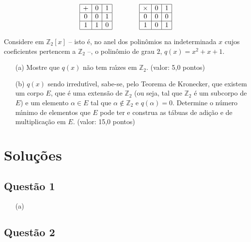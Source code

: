 \documentclass{report}
\begin{document}
$$\begin{array}{|c|c|c|}
\hline + & 0 & 1 \\
\hline 0 & 0 & 1 \\
\hline 1 & 1 & 0 \\
\hline
\end{array} \qquad \qquad
\begin{array}{|c|c|c|}
\hline \times & 0 & 1 \\
\hline 0 & 0 & 0 \\
\hline 1 & 0 & 1 \\
\hline
\end{array}$$

Considere em $\mathbb Z_2[x]$ – isto \'e, no anel dos polinômios na indeterminada $x$ cujos coeficientes pertencem a $\mathbb Z_2$ –, o polinômio de grau $2$, $q (x) = x^2 + x + 1$.

\begin{enumerate}

\item[(a)] Mostre que $q(x)$ n\~ao tem ra\'\i zes em $\mathbb Z_2$. (valor: 5,0 pontos)

\item[(b)] $q(x)$ sendo irredut\'\i vel, sabe-se, pelo Teorema de Kronecker, que existem um corpo $E$, que \'e uma extens\~ao de $\mathbb Z_2$ (ou seja, tal que $\mathbb Z_2$ \'e um subcorpo de $E$) e um elemento $\alpha \in E$ tal que $\alpha \notin \mathbb Z_2$ e $q(\alpha) = 0$. Determine o n\'umero m\'\i nimo de elementos que $E$ pode ter e construa as t\'abuas de adi\c c\~ao e de multiplica\c c\~ao em $E$. (valor: 15,0 pontos)

\end{enumerate}

\section{\color{red} Solu\c c\~oes}

\subsection{\color{red} Quest\~ao 1}

\begin{enumerate}

\item[(a)]

\end{enumerate}

\subsection{\color{red} Quest\~ao 2}
\end{document}
